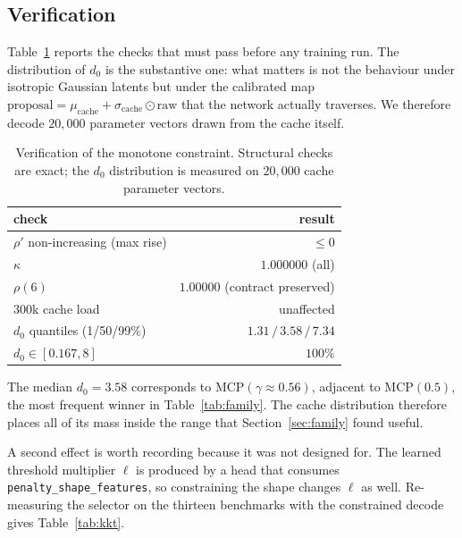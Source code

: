 \documentclass[11pt]{article}
\begin{document}
\subsection{Verification}

Table~\ref{tab:verify} reports the checks that must pass before any training
run. The distribution of $d_0$ is the substantive one: what matters is not the
behaviour under isotropic Gaussian latents but under the calibrated map
$\text{proposal} = \mu_{\mathrm{cache}} + \sigma_{\mathrm{cache}} \odot
\text{raw}$ that the network actually traverses. We therefore decode $20{,}000$
parameter vectors drawn from the cache itself.

\begin{table}[h]
\centering
\caption{Verification of the monotone constraint. Structural checks are exact;
the $d_0$ distribution is measured on $20{,}000$ cache parameter vectors.}
\label{tab:verify}
\begin{tabular}{@{}lr@{}}
\toprule
check & result \\
\midrule
$\rho'$ non-increasing (max rise) & $\le 0$ \\
$\kappa$                          & $1.000000$ (all) \\
$\rho(6)$                         & $1.00000$ (contract preserved) \\
$300$k cache load                 & unaffected \\
$d_0$ quantiles (1/50/99\%)       & $1.31 \,/\, 3.58 \,/\, 7.34$ \\
$d_0 \in [0.167, 8]$              & $100\%$ \\
\bottomrule
\end{tabular}
\end{table}

The median $d_0 = 3.58$ corresponds to MCP$(\gamma \approx 0.56)$, adjacent to
MCP$(0.5)$, the most frequent winner in Table~\ref{tab:family}. The cache
distribution therefore places all of its mass inside the range that
Section~\ref{sec:family} found useful.

A second effect is worth recording because it was not designed for. The
learned threshold multiplier $\ell$ is produced by a head that consumes
\texttt{penalty\_shape\_features}, so constraining the shape changes $\ell$ as
well. Re-measuring the selector on the thirteen benchmarks with the
constrained decode gives Table~\ref{tab:kkt}.
\end{document}
